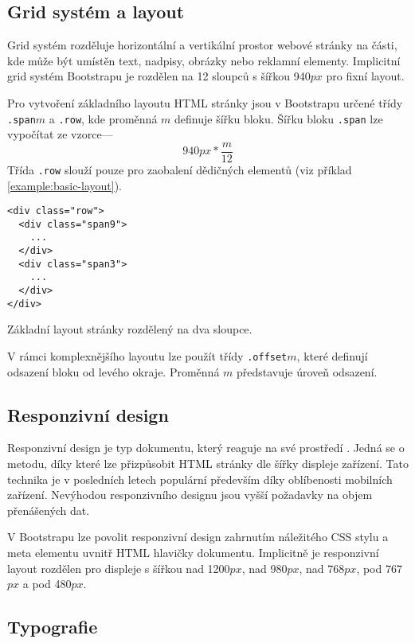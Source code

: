 \subsection{Grid systém a layout}

Grid systém rozděluje horizontální a vertikální prostor webové stránky na části, kde může být umístěn text, nadpisy, obrázky nebo reklamní elementy. Implicitní grid systém Bootstrapu je rozdělen na 12 sloupců s šířkou 940$px$ pro fixní layout.

Pro vytvoření základního layoutu HTML stránky jsou v Bootstrapu určené třídy \texttt{.span}$m$ a \texttt{.row}, kde proměnná $m$ definuje šířku bloku. Šířku bloku \texttt{.span} lze vypočítat ze vzorce---
$$940px * \frac{m}{12}$$
Třída \texttt{.row} slouží pouze pro zaobalení dědičných elementů (viz příklad \ref{example:basic-layout}).

\begin{example}
    \centering
    \begin{lstlisting}
<div class="row">
  <div class="span9">
    ...
  </div>
  <div class="span3">
    ...
  </div>
</div>
    \end{lstlisting}
    \caption{Základní layout stránky rozdělený na dva sloupce.}
    \label{example:basic-layout}
\end{example}

V rámci komplexnějšího layoutu lze použít třídy \texttt{.offset}$m$, které definují odsazení bloku od levého okraje. Proměnná $m$ představuje úroveň odsazení.

\subsection{Responzivní design}

Responzivní design je typ dokumentu, který reaguje na své prostředí \cite{responsive-design}. Jedná se o metodu, díky které lze přizpůsobit HTML stránky dle šířky displeje zařízení. Tato technika je v posledních letech populární především díky oblíbenosti mobilních zařízení. Nevýhodou responzivního designu jsou vyšší požadavky na objem přenášených dat.

V Bootstrapu lze povolit responzivní design zahrnutím náležitého CSS stylu a meta elementu uvnitř HTML hlavičky dokumentu. Implicitně je responzivní layout rozdělen pro displeje s šířkou nad 1200$px$, nad 980$px$, nad 768$px$, pod 767$px$ a pod 480$px$.

\subsection{Typografie}

